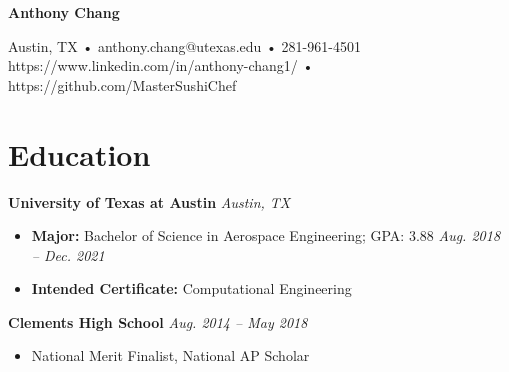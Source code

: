 \documentclass[letterpaper,11pt]{article}
\begin{document}
\begin{center}
\textbf{\LARGE{Anthony Chang}}

Austin, TX • anthony.chang@utexas.edu • 281-961-4501\\
https://www.linkedin.com/in/anthony-chang1/ • https://github.com/MasterSushiChef
\end{center}

\section{Education}
\textbf{University of Texas at Austin} \hfill \textit{Austin, TX}\\
\begin{itemize}[noitemsep, topsep=0pt, leftmargin=0.7cm]
  \item \textbf{Major:} Bachelor of Science in Aerospace Engineering; GPA: 3.88 \hfill \textit{Aug. 2018 -- Dec. 2021}\\
  \item \textbf{Intended Certificate:} Computational Engineering\\
\end{itemize}
\textbf{\small{Clements High School}} \hfill \textit{Aug. 2014 -- May 2018}
\begin{itemize}[noitemsep, topsep=0pt, leftmargin=0.7cm]
  \item \small{National Merit Finalist, National AP Scholar}
\end{itemize}
\end{document}
